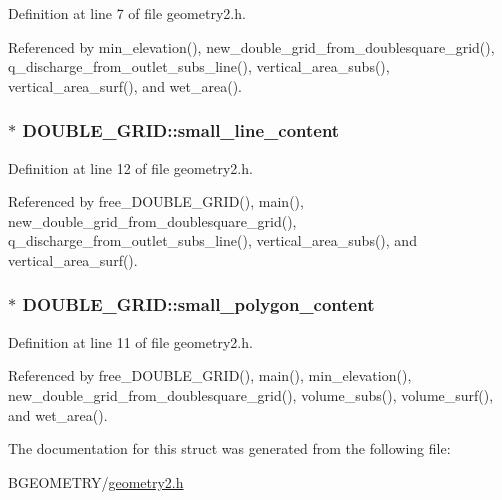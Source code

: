 Definition at line 7 of file geometry2.\-h.



Referenced by min\-\_\-elevation(), new\-\_\-double\-\_\-grid\-\_\-from\-\_\-doublesquare\-\_\-grid(), q\-\_\-discharge\-\_\-from\-\_\-outlet\-\_\-subs\-\_\-line(), vertical\-\_\-area\-\_\-subs(), vertical\-\_\-area\-\_\-surf(), and wet\-\_\-area().

\hypertarget{struct_d_o_u_b_l_e___g_r_i_d_a5144f0a2fa85740ff967b4d6cc5080a2}{
\subsubsection[{small\-\_\-line\-\_\-content}]{$\ast$ D\-O\-U\-B\-L\-E\-\_\-\-G\-R\-I\-D\-::small\-\_\-line\-\_\-content}}\label{struct_d_o_u_b_l_e___g_r_i_d_a5144f0a2fa85740ff967b4d6cc5080a2}


Definition at line 12 of file geometry2.\-h.



Referenced by free\-\_\-\-D\-O\-U\-B\-L\-E\-\_\-\-G\-R\-I\-D(), main(), new\-\_\-double\-\_\-grid\-\_\-from\-\_\-doublesquare\-\_\-grid(), q\-\_\-discharge\-\_\-from\-\_\-outlet\-\_\-subs\-\_\-line(), vertical\-\_\-area\-\_\-subs(), and vertical\-\_\-area\-\_\-surf().

\hypertarget{struct_d_o_u_b_l_e___g_r_i_d_abd184e763abf235679ab867b1d370249}{
\subsubsection[{small\-\_\-polygon\-\_\-content}]{$\ast$ D\-O\-U\-B\-L\-E\-\_\-\-G\-R\-I\-D\-::small\-\_\-polygon\-\_\-content}}\label{struct_d_o_u_b_l_e___g_r_i_d_abd184e763abf235679ab867b1d370249}


Definition at line 11 of file geometry2.\-h.



Referenced by free\-\_\-\-D\-O\-U\-B\-L\-E\-\_\-\-G\-R\-I\-D(), main(), min\-\_\-elevation(), new\-\_\-double\-\_\-grid\-\_\-from\-\_\-doublesquare\-\_\-grid(), volume\-\_\-subs(), volume\-\_\-surf(), and wet\-\_\-area().



The documentation for this struct was generated from the following file\-:\begin{DoxyCompactItemize}
\item 
B\-G\-E\-O\-M\-E\-T\-R\-Y/\hyperlink{geometry2_8h}{geometry2.\-h}\end{DoxyCompactItemize}
